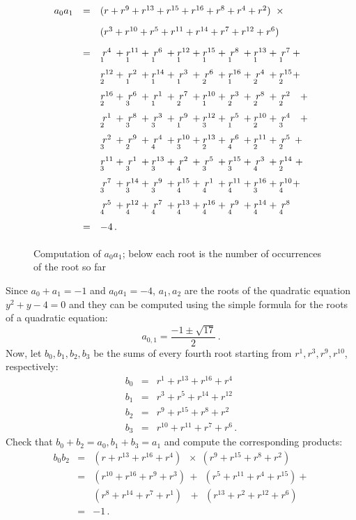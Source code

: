 \begin{figure}[t]
\[
\renewcommand{\arraystretch}{1.8}
\begin{array}{lcl}
a_0a_1&=&(r + r^9 + r^{13} +r^{15} +r^{16} + r^8+r^4+r^2)\;\;\times\\
&&(r^3 + r^{10} + r^{5} +r^{11} +r^{14} + r^7+r^{12}+r^6)\\
&=&\occ{4}{1} + \occ{11}{1} + \occ{6}{1} + \occ{12}{1} + \occ{15}{1} + \occ{8}{1} + \occ{13}{1} + \occ{7}{1} +\\
&&\occ{12}{2} + \occ{2}{1} + \occ{14}{1} + \occ{3}{1} + \occ{6}{2} + \occ{16}{1} + \occ{4}{2} + \occ{15}{2} +\\
&&\occ{16}{2} + \occ{6}{3} + \occ{1}{1} + \occ{7}{2} + \occ{10}{1} + \occ{3}{2} + \occ{8}{2} + \occ{2}{2}\;\;\: +\\
&&\occ{1}{2} + \occ{8}{3} + \occ{3}{3} + \occ{9}{1} + \occ{12}{3} + \occ{5}{1} + \occ{10}{2} + \occ{4}{3}\;\;\: +\\
&&\occ{2}{3} + \occ{9}{2} + \occ{4}{4} + \occ{10}{3} + \occ{13}{2} + \occ{6}{4} + \occ{11}{2} + \occ{5}{2} \:+\\
&&\occ{11}{3} + \occ{1}{3} + \occ{13}{3} + \occ{2}{4} + \occ{5}{3} + \occ{15}{3} + \occ{3}{4} + \occ{14}{2} \;+\\
&&\occ{7}{3} + \occ{14}{3} + \occ{9}{3} + \occ{15}{4} + \occ{1}{4} + \occ{11}{4} + \occ{16}{3} + \occ{10}{4} +\\
&&\occ{5}{4} + \occ{12}{4} + \occ{7}{4} + \occ{13}{4} + \occ{16}{4} + \occ{9}{4} + \occ{14}{4} + \occ{8}{4}\\
&=&-4\,.
\end{array}
\]
\caption{Computation of $a_0a_1$; below each root is the number of occurrences of the root so far}\label{fig.a0a1}
\end{figure}

\newpage

Since $a_0+a_1=-1$ and $a_0 a_1=-4$, $a_1,a_2$ are the roots of the quadratic equation $y^2+y-4=0$ and they can be computed using the simple formula for the roots of a quadratic equation:
\[
a_{0,1} = \frac{-1\pm\sqrt{17}}{2}\,.
\]
Now, let $b_0,b_1,b_2,b_3$ be the sums of every fourth root starting from $r^1,r^3,r^9,r^{10}$, respectively:
\begin{eqnarray*}
b_0&=& r^1+ r^{13} + r^{16} + r^4\\
b_1&=& r^3+ r^{5} + r^{14} + r^{12}\\
b_2&=& r^9+ r^{15} + r^{8} + r^2\\
b_3&=& r^{10}+ r^{11} + r^{7} + r^6\,.
\end{eqnarray*}
Check that $b_0+b_2=a_0, b_1+b_3=a_1$ and compute the corresponding products:
\begin{eqnarray*}
b_0b_2&=&(r + r^{13} + r^{16} +r^4)\;\;\times\;(r^9 + r^{15} + r^{8} +r^{2})\\
&=&(r^{10}+r^{16}+r^9+r^3)\,+\;\,(r^{5}+r^{11}+r^4+r^{15})+\\
&&(r^{8}+r^{14}+r^7+r^1)\,\;\,+\;\,(r^{13}+r^{2}+r^{12}+r^6)\\
&=&-1\,.
\end{eqnarray*}

